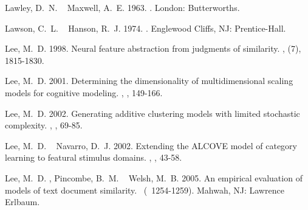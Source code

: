 \documentclass[11pt]{article}
\begin{document}
\begin{thebibliography}{}
%
%
Lawley, D.~N.%
\BCBT{}\ \BBA{} Maxwell, A.~E.%
%
\newblock{}\BBOP{}1963\BBCP{}.
\newblock{}.
\newblock{}London: Butterworths.

%
%
Lawson, C.~L.%
\BCBT{}\ \BBA{} Hanson, R.~J.%
%
\newblock{}\BBOP{}1974\BBCP{}.
\newblock{}.
\newblock{}Englewood Cliffs, NJ: Prentice-Hall.

%
%
Lee, M.~D.%
%
\newblock{}\BBOP{}1998\BBCP{}.
\newblock{}\BBOQ{}Neural feature abstraction from judgments of
  similarity.\BBCQ{}
\newblock{}, (7), 1815-1830.

%
%
Lee, M.~D.%
%
\newblock{}\BBOP{}2001\BBCP{}.
\newblock{}\BBOQ{}Determining the dimensionality of multidimensional scaling
  models for cognitive modeling.\BBCQ{}
\newblock{}, , 149-166.

%
%
Lee, M.~D.%
%
\newblock{}\BBOP{}2002\BBCP{}.
\newblock{}\BBOQ{}Generating additive clustering models with limited stochastic
  complexity.\BBCQ{}
\newblock{}, , 69-85.

%
%
Lee, M.~D.%
\BCBT{}\ \BBA{} Navarro, D.~J.%
%
\newblock{}\BBOP{}2002\BBCP{}.
\newblock{}\BBOQ{}Extending the {ALCOVE} model of category learning to featural
  stimulus domains.\BBCQ{}
\newblock{}, , 43-58.

%
%
Lee, M.~D.%
, Pincombe, B.~M.%
\BCBL{}\ \BBA{} Welsh, M.~B.%
%
\newblock{}\BBOP{}2005\BBCP{}.
\newblock{}\BBOQ{}An empirical evaluation of models of text document
  similarity.\BBCQ{}
\newblock{}\BIn{} \ (\BPG\ 1254-1259).
\newblock{}Mahwah, NJ: Lawrence Erlbaum.


\end{thebibliography}
\end{document}
